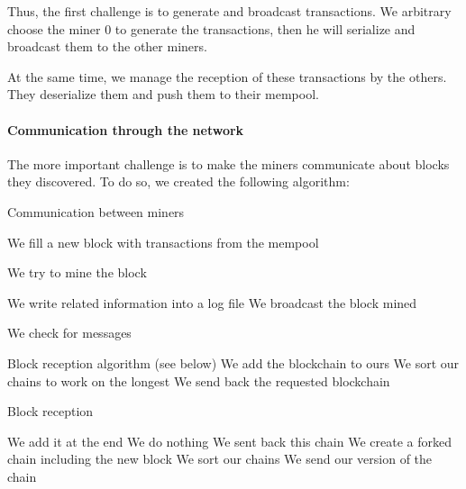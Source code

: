 Thus, the first challenge is to generate and broadcast transactions. We arbitrary choose the miner 0 to generate the transactions, then he will serialize and broadcast them to the other miners.

At the same time, we manage the reception of these transactions by the others. They deserialize them and push them to their mempool. \newline

\paragraph{Communication through the network}

The more important challenge is to make the miners communicate about blocks they discovered. To do so, we created the following algorithm:

\clearpage

\begin{algorithm}
  \caption{Communication between miners}
  \begin{algorithmic}

      \STATE We fill a new block with transactions from the mempool

        \STATE We try to mine the block

          \STATE We write related information into a log file
          \STATE We broadcast the block mined
        \ENDIF

        \STATE We check for messages

          \STATE Block reception algorithm (see below)
          \STATE We add the blockchain to ours
          \STATE We sort our chains to work on the longest
          \STATE We send back the requested blockchain
        \ENDIF

      \ENDWHILE
    \ENDWHILE
  \end{algorithmic}
\end{algorithm}

\begin{algorithm}
  \caption{Block reception}

  \begin{algorithmic}
        \STATE We add it at the end
        \STATE We do nothing
      \ELSE
            \STATE We sent back this chain
            \STATE We create a forked chain including the new block
            \STATE We sort our chains
            \STATE We send our version of the chain
          \ENDIF
        \ENDFOR
      \ENDIF
    \ENDFOR

  \end{algorithmic}

\end{algorithm}

